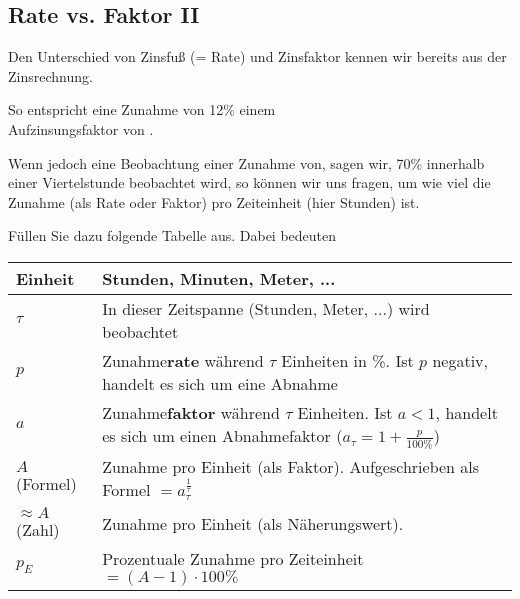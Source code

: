 \subsection{Rate vs. Faktor
  II}

Den Unterschied von Zinsfuß (= Rate) und Zinsfaktor kennen wir bereits aus der Zinsrechnung.

So entspricht eine Zunahme von 12\% einem\\
Aufzinsungsfaktor von .

Wenn jedoch eine Beobachtung einer Zunahme von, sagen wir, 70\% innerhalb einer Viertelstunde beobachtet wird, so können wir uns fragen, um wie viel die Zunahme (als Rate oder Faktor) pro Zeiteinheit (hier Stunden) ist.


Füllen Sie dazu folgende Tabelle aus. Dabei bedeuten

\begin{tabular}{lp{14cm}}\hline
  Einheit & Stunden, Minuten, Meter, ... \\\hline
  $\tau$  & In dieser Zeitspanne (Stunden, Meter, ...) wird beobachtet \\\hline
  $p$     & Zunahme\textbf{rate}\index{Zunahmerate}\index{Rate} während $\tau$ Einheiten in \%. Ist $p$ negativ, handelt es sich um eine Abnahme\\\hline
  $a$ & Zunahme\textbf{faktor}\index{Zunahmefaktor} während
  $\tau$ Einheiten. Ist $a<1$, handelt es sich um einen Abnahmefaktor
  ($a_{\tau} = 1+\frac{p}{100\%}$)\\\hline
  $A$ (Formel)   & Zunahme pro Einheit (als Faktor). Aufgeschrieben
  als Formel $=a_{\tau}^{\frac1{\tau}}$\\\hline
  $\approx A$ (Zahl)  & Zunahme pro Einheit (als Näherungswert).\\\hline
  $p_E$   & Prozentuale Zunahme pro Zeiteinheit $=(A-1)\cdot{}100\%$\\\hline
  \end{tabular} 

\leserluft{}
\leserluft{}
\newcommand{\ph}[1]{\noTRAINER{...........}\TRAINER{#1}}

